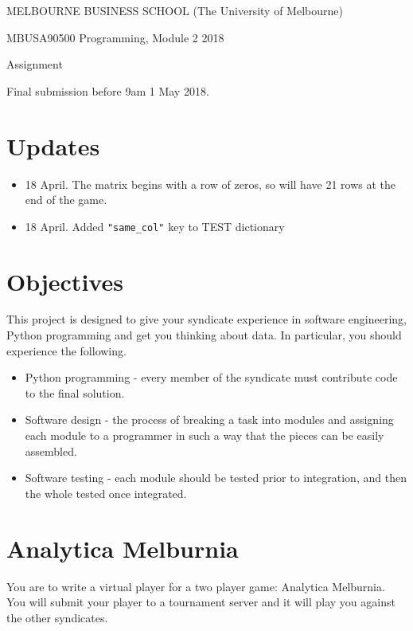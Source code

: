 \documentclass{article}
\title{}
\date{}
\begin{document}
{\Large \bf
\begin{center}
MELBOURNE BUSINESS SCHOOL
(The University of Melbourne)

MBUSA90500 Programming, Module 2 2018
 
Assignment

Final submission before 9am 1 May 2018.

\end{center}
}
\section{Updates}

\begin{itemize}
    \item 18 April. The matrix begins with a row of zeros, so will have 21 rows at the end of the game.
    \item 18 April. Added {\tt "same\_col"} key to TEST dictionary
\end{itemize}
 
\section{Objectives}

This project is designed to give your syndicate experience in 
software engineering,
Python programming and get you thinking about data.
In particular, you should experience the following.
\begin{itemize}
    \item Python programming - every member of the syndicate must contribute code to the
          final solution.
    \item Software design - the process of breaking a task into modules and assigning 
          each module to a programmer in such a way that the pieces can be easily
          assembled.
    \item Software testing - each module should be tested prior to integration, and then
          the whole tested once integrated.
\end{itemize}



\section{Analytica Melburnia}

You are to write a virtual player for a two player game: Analytica Melburnia. 
You will submit your player to a tournament server and it will play you against the other syndicates.
\end{document}
